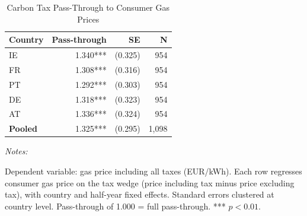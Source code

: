\begin{table}[!h]
\centering
\caption{Carbon Tax Pass-Through to Consumer Gas Prices\label{tab:passthrough}}
\centering
\begin{threeparttable}
\begin{tabular}[t]{lrrr}
\toprule
Country & Pass-through & SE & N\\
\midrule
IE & 1.340*** & (0.325) & 954\\
FR & 1.308*** & (0.316) & 954\\
PT & 1.292*** & (0.303) & 954\\
DE & 1.318*** & (0.323) & 954\\
AT & 1.336*** & (0.324) & 954\\
\addlinespace
\textbf{Pooled} & 1.325*** & (0.295) & 1,098\\
\bottomrule
\end{tabular}
\begin{tablenotes}
\item \textit{Notes:} 
\item Dependent variable: gas price including all taxes (EUR/kWh). Each row regresses consumer gas price on the tax wedge (price including tax minus price excluding tax), with country and half-year fixed effects. Standard errors clustered at country level. Pass-through of 1.000 = full pass-through. *** $p<0.01$.
\end{tablenotes}
\end{threeparttable}
\end{table}
